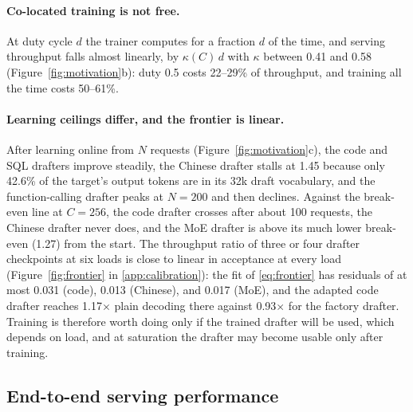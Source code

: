 \documentclass{article}
\begin{document}
\paragraph{Co-located training is not free.} At duty cycle $d$ the trainer computes for a fraction $d$ of the time, and serving throughput falls almost linearly, by $\kappa(C)\,d$ with $\kappa$ between 0.41 and 0.58 (Figure~\ref{fig:motivation}b): duty 0.5 costs 22--29\% of throughput, and training all the time costs 50--61\%.

\paragraph{Learning ceilings differ, and the frontier is linear.} After learning online from $N$ requests (Figure~\ref{fig:motivation}c), the code and SQL drafters improve steadily, the Chinese drafter stalls at 1.45 because only 42.6\% of the target's output tokens are in its 32k draft vocabulary, and the function-calling drafter peaks at $N{=}200$ and then declines. Against the break-even line at $C{=}256$, the code drafter crosses after about 100 requests, the Chinese drafter never does, and the MoE drafter is above its much lower break-even (1.27) from the start. The throughput ratio of three or four drafter checkpoints at six loads is close to linear in acceptance at every load (Figure~\ref{fig:frontier} in \cref{app:calibration}): the fit of \cref{eq:frontier} has residuals of at most 0.031 (code), 0.013 (Chinese), and 0.017 (MoE), and the adapted code drafter reaches 1.17$\times$ plain decoding there against 0.93$\times$ for the factory drafter. Training is therefore worth doing only if the trained drafter will be used, which depends on load, and at saturation the drafter may become usable only after training.

\subsection{End-to-end serving performance}\label{sec:results}
\end{document}
